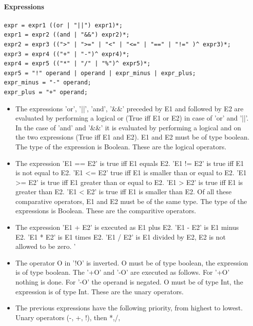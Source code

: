 \documentclass[paper=a4, fontsize=11pt]{article}
\numberwithin{equation}{section}		%
\numberwithin{figure}{section}			%
\numberwithin{table}{section}				%
\begin{document}
\paragraph{Expressions}
\begin{verbatim}
expr = expr1 ((or | "||") expr1)*;
expr1 = expr2 ((and | "&&") expr2)*;
expr2 = expr3 ((">" | ">=" | "<" | "<=" | "==" | "!=" )^ expr3)*;
expr3 = expr4 (("+" | "-")^ expr4)*;
expr4 = expr5 (("*" | "/" | "%")^ expr5)*;
expr5 = "!" operand | operand | expr_minus | expr_plus;
expr_minus = "-" operand;
expr_plus = "+" operand;
\end{verbatim}
\begin{itemize}
\item The expressions 'or', '||', 'and', '\&\&' preceded by E1 and followed by E2 are evaluated by performing a logical or (True iff E1 or E2) in case of 'or' and '||'. In the case of 'and' and '\&\&' it is evaluated by performing a logical and on the two expressions (True iff E1 and E2). E1 and E2 must be of type boolean. The type of the expression is Boolean. These are the logical operators. 
\item The expression 'E1 == E2' is true iff E1 equals E2. 'E1 != E2' is true iff E1 is not equal to E2. 'E1 <= E2' true iff E1 is smaller than or equal to E2. 'E1 >= E2' is true iff E1 greater than or equal to E2. 'E1 > E2' is true iff E1 is greater than E2. 'E1 < E2' is true iff E1 is smaller than E2. Of all these comparative operators, E1 and E2 must be of the same type. The type of the expressions is Boolean. These are the comparitive operators. 
\item The expression 'E1 + E2' is executed as E1 plus E2. 'E1 - E2' is E1 minus E2. 'E1 * E2' is E1 times E2. 'E1 / E2' is E1 divided by E2, E2 is not allowed to be zero. '%
\item The operator O in '!O' is inverted. O must be of type boolean, the expression is of type boolean. The '+O' and '-O' are executed as follows. For '+O' nothing is done. For '-O' the operand is negated. O must be of type Int, the expression is of type Int. These are the unary operators.
\item The previous expressions have the following priority, from highest to lowest. Unary operators (-, +, !), then *,/,%
\end{itemize}
\end{document}
